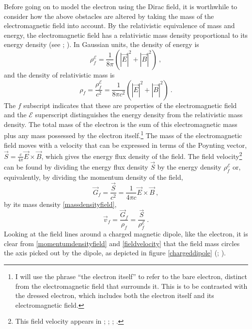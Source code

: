 \documentclass[12pt,secnumarabic,amsmath,amssymb,balancelastpage,nofootinbib]{article}
\begin{document}
Before going on to model the electron using the Dirac field, it is worthwhile to consider how the above obstacles are altered by taking the mass of the electromagnetic field into account.  By the relativistic equivalence of mass and energy, the electromagnetic field has a relativistic mass density proportional to its energy density (see \citealp{lange}; \citealp{forcesonfields}).  In Gaussian units, the density of energy is
\begin{equation}
\rho_f^{\mathcal{E}}=\frac{1}{8 \pi}\left(|\vec{E}|^2+|\vec{B}|^2\right)\ ,
\label{energydensityfield}
\end{equation}
and the density of relativistic mass is
\begin{equation}
\rho_f=\frac{\rho_f^{\mathcal{E}}}{c^2}=\frac{1}{8 \pi c^2}\left(|\vec{E}|^2+|\vec{B}|^2\right) \ .
\label{massdensityfield}
\end{equation}
The $f$ subscript indicates that these are properties of the electromagnetic field and the $\mathcal{E}$ superscript distinguishes the energy density from the relativistic mass density.  The total mass of the electron is the sum of this electromagnetic mass plus any mass possessed by the electron itself.\footnote{I will use the phrase ``the electron itself'' to refer to the bare electron, distinct from the electromagnetic field that surrounds it.  This is to be contrasted with the dressed electron, which includes both the electron itself and its electromagnetic field.}  The mass of the electromagnetic field moves with a velocity that can be expressed in terms of the Poynting vector, $\vec{S}= \frac{c}{4\pi} \vec{E} \times \vec{B}$, which gives the energy flux density of the field.  The field velocity\footnote{This field velocity appears in \citet{poincare1900}; \citet[section 12.6.2]{holland}; \citet[box 8.3]{lange}; \citet{forcesonfields}.} can be found by dividing the energy flux density $\vec{S}$ by the energy density $\rho_f^{\mathcal{E}}$ or, equivalently, by dividing the momentum density of the field,
\begin{equation}
\vec{G}_f=\frac{\vec{S}}{c^2}= \frac{1}{4\pi c} \vec{E} \times \vec{B} \ ,
\label{momentumdensityfield}
\end{equation}
by its mass density \eqref{massdensityfield},
\begin{equation}
\vec{v}_f=\frac{\vec{G}_f}{\rho_f}=\frac{\vec{S}}{\rho_f^{\mathcal{E}}}\ .
\label{fieldvelocity}
\end{equation}
Looking at the field lines around a charged magnetic dipole, like the electron, it is clear from \eqref{momentumdensityfield} and \eqref{fieldvelocity} that the field mass circles the axis picked out by the dipole, as depicted in figure \ref{chargeddipole} (\citealp[chapter 27]{feynman2}; \citealp[chapter 8]{lange}).
\end{document}
